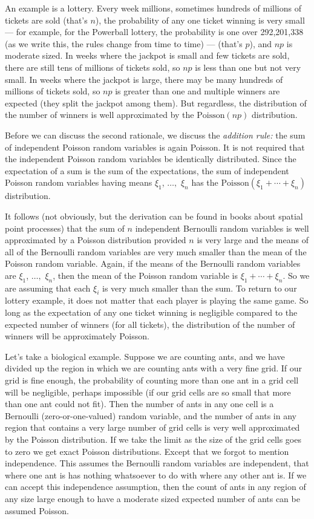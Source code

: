 An example is a lottery.  Every week millions, sometimes hundreds of millions
of tickets are sold (that's $n$), the probability of any one ticket winning
is very small --- for example, for the Powerball lottery, the probability is
one over 292,201,338 (as we write this, the rules change from time to time) ---
(that's $p$), and $n p$ is moderate sized.  In weeks where the jackpot is small
and few tickets are sold, there are still tens of millions of tickets sold,
so $n p$ is less than one but not very small.  In weeks where the jackpot
is large, there may be many hundreds of millions
of tickets sold, so $n p$ is greater
than one and multiple winners are expected (they split the jackpot among them).
But regardless, the distribution of the number of winners is well approximated
by the $\text{Poisson}(n p)$ distribution.

Before we can discuss the second rationale, we discuss the \emph{addition rule:}
the sum of independent Poisson random variables is again Poisson.
It is not required that the independent Poisson random variables be
identically distributed.  Since the expectation of a sum is the sum of the
expectations, the sum of independent Poisson random variables having
means $\xi_1$, $\ldots,$ $\xi_n$ has
the $\text{Poisson}(\xi_1 + \cdots + \xi_n)$ distribution.

It follows (not obviously, but the derivation can be found in books
about spatial point processes) that the sum of $n$ independent Bernoulli
random variables is well approximated by a Poisson distribution provided
$n$ is very large and the means of all of the Bernoulli random variables
are very much smaller than the mean of the Poisson random variable.
Again, if the means of the Bernoulli random variables
are $\xi_1$, $\ldots,$ $\xi_n$, then the mean of the Poisson random variable
is $\xi_1 + \cdots + \xi_n$.  So we are assuming that each $\xi_i$ is very
much smaller than the sum.  To return to our lottery example, it does not
matter that each player is playing the same game.  So long as the expectation
of any one ticket winning is negligible compared to the expected number of
winners (for all tickets), the distribution of the number of winners will
be approximately Poisson.

Let's take a biological example.  Suppose we are counting ants, and we
have divided up the region in which we are counting ants with a very fine
grid.  If our grid is fine enough, the probability of counting more than one
ant in a grid cell will be negligible, perhaps impossible (if our grid cells
are so small that more than one ant could not fit).  Then the number of
ants in any one cell is a Bernoulli (zero-or-one-valued) random variable,
and the number of ants in any region that contains a very large number
of grid cells is very well approximated by the Poisson distribution.
If we take the limit as the size of the grid cells goes to zero we
get exact Poisson distributions.  Except that we forgot to mention
independence.  This assumes the Bernoulli random variables are independent,
that where one ant is has nothing whatsoever to do with where any other ant
is.  If we can accept this independence assumption, then the count of
ants in any region of any size large enough to have a moderate sized
expected number of ants can be assumed Poisson.

